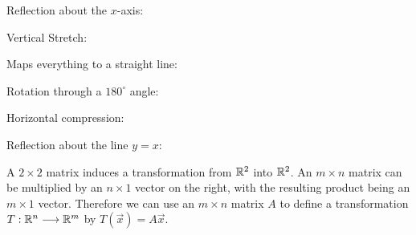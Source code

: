 \documentclass{ximera}
\begin{document}
\begin{exploration}
Reflection about the $x$-axis: 

Vertical Stretch: 

Maps everything to a straight line: 

Rotation through a $180^{\circ}$ angle: 

Horizontal compression: 

Reflection about the line $y=x$: 


\end{exploration}

A $2\times 2$ matrix induces a transformation from $\mathbb{R}^2$ into $\mathbb{R}^2$.  An $m\times n$ matrix can be multiplied by an $n\times 1$ vector on the right, with the resulting product being an $m\times 1$ vector.  Therefore we can use an $m\times n$ matrix $A$ to define a transformation $T:\mathbb{R}^n\longrightarrow \mathbb{R}^m$ by $T(\vec{x})=A\vec{x}$.
\end{document}

